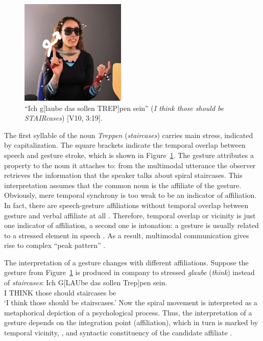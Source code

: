 \documentclass[output=paper]{langsci/langscibook}
\begin{document}
\begin{figure}[tb]
  \includegraphics[trim={1cm 1cm 1cm 1cm}, clip, width=5cm]{figures/treppen-2}
  \caption[Staircases]{\enquote{Ich g[laube das sollen TREP]pen sein} (\textit{I think those should be STAIRcases}) [V10, 3:19].}
  \label{fig:staircases}
\end{figure}

The first syllable of the  noun \textit{Treppen} (\textit{staircases}) carries main stress, indicated by capitalization. 
%
The square brackets indicate the temporal overlap between speech and gesture stroke, which is shown in Figure~\ref{fig:staircases}.
%
The gesture attributes a property to the noun it attaches to: from the multimodal utterance the observer retrieves the information that the speaker talks about spiral staircases. 
%
This interpretation assumes that the common noun is the affiliate of the gesture.
%
Obviously, mere temporal synchrony is too weak to be an indicator of affiliation.
%
In fact, there are speech-gesture affiliations without temporal overlap between gesture and verbal affiliate at all \citep[e.g.][]{Luecking:Rieser:Stegmann:2004}.
%
Therefore, temporal overlap or vicinity is just one indicator of affiliation, a second one is intonation: a gesture is usually related to a stressed element in speech \citep{McClave:1994,Nobe:2000,Loehr:2004,Loehr:2007}. 
%
As a result, multimodal communication gives rise to complex \enquote{peak pattern} \citep{Tuite:1993,Loehr:2004,Jannedy:Mendoza-Denton:2005}.


The interpretation of a gesture changes with different affiliations. 
%
Suppose the gesture from Figure~\ref{fig:staircases} is produced in company to stressed \textit{glaube} (\textit{think}) instead of \textit{staircases}: 
%
\ea \label{ex:think}
\gll Ich G[LAUbe das sollen Trep]pen sein.\\
     I THINK those should staircases be \\
\glt \enquote*{I think those should be stairscases.}
\z
%
Now the spiral movement is interpreted as a metaphorical depiction of a psychological process.
%
Thus, the interpretation of a gesture depends on the integration point (affiliation),  which in turn is marked by temporal vicinity, , and syntactic constituency of the candidate affiliate \citep{Alahverdzhieva:Lascarides:Flickinger:2017}.
\end{document}
